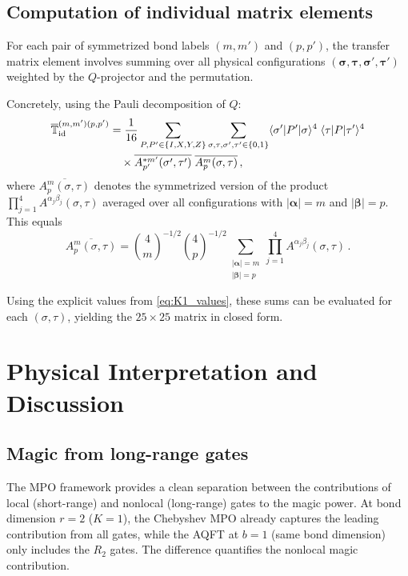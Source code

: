 \documentclass[11pt,a4paper]{article}
\theoremstyle{definition}
\theoremstyle{remark}
\begin{document}
\subsection{Computation of individual matrix elements}

For each pair of symmetrized bond labels $(m,m')$ and $(p,p')$, the transfer matrix element involves summing over all physical configurations $(\boldsymbol{\sigma},\boldsymbol{\tau},\boldsymbol{\sigma}',\boldsymbol{\tau}')$ weighted by the $Q$-projector and the permutation.

Concretely, using the Pauli decomposition of $Q$:
\begin{align}
  \overline{\mathbb{T}}_{\mathrm{id}}^{(m,m')(p,p')}
  &= \frac{1}{16}\sum_{P,P'\in\{I,X,Y,Z\}}
  \sum_{\sigma,\tau,\sigma',\tau'\in\{0,1\}}
  \langle\sigma'|P'|\sigma\rangle^4\;\langle\tau|P|\tau'\rangle^4\notag\\
  &\quad \times
  \overline{A^{*m'}_{p'}(\sigma',\tau')}\;\overline{A^m_p(\sigma,\tau)}\,,
\end{align}
where $\overline{A^m_p(\sigma,\tau)}$ denotes the symmetrized version of the product $\prod_{j=1}^4 A^{\alpha_j\beta_j}(\sigma,\tau)$ averaged over all configurations with $|\boldsymbol{\alpha}|=m$ and $|\boldsymbol{\beta}|=p$.  This equals
\begin{equation}
  \overline{A^m_p(\sigma,\tau)} = \binom{4}{m}^{-1/2}\binom{4}{p}^{-1/2}
  \sum_{\substack{|\boldsymbol{\alpha}|=m\\|\boldsymbol{\beta}|=p}}
  \prod_{j=1}^4 A^{\alpha_j\beta_j}(\sigma,\tau)\,.
\end{equation}

Using the explicit values from \eqref{eq:K1_values}, these sums can be evaluated for each $(\sigma,\tau)$, yielding the $25\times 25$ matrix in closed form.

\section{Physical Interpretation and Discussion}
\label{sec:discussion}

\subsection{Magic from long-range gates}

The MPO framework provides a clean separation between the contributions of local (short-range) and nonlocal (long-range) gates to the magic power.  At bond dimension $r=2$ ($K=1$), the Chebyshev MPO already captures the leading contribution from all gates, while the AQFT at $b=1$ (same bond dimension) only includes the $R_2$ gates.  The difference quantifies the nonlocal magic contribution.
\end{document}
